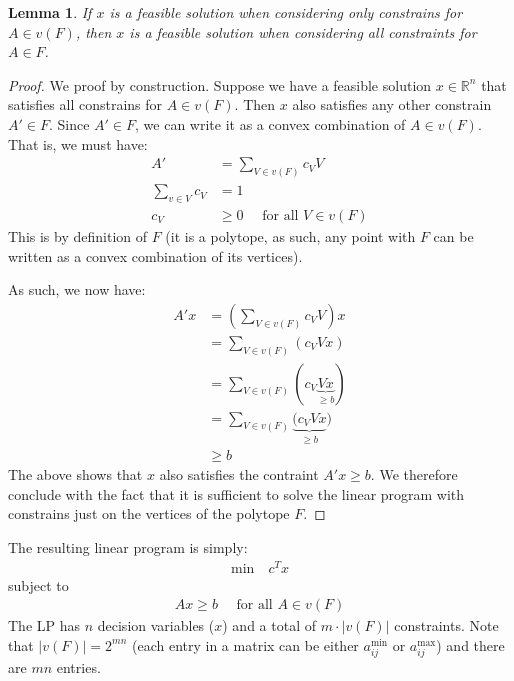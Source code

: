 \documentclass[12pt]{exam}
\newtheorem{lemma}[theorem]{Lemma}
\begin{document}
\begin{questions}
\begin{solution}
\begin{enumerate}[label=(\alph*)]
      \begin{lemma}
        If $x$ is a feasible solution when considering only constrains for $A \in v(F)$, then $x$ is a feasible solution when considering all constraints for $A \in F$.
      \end{lemma}
      \begin{proof}
        We proof by construction. Suppose we have a feasible solution $x \in \mathbb{R}^n$ that satisfies all constrains for $A \in v(F)$. Then $x$ also satisfies any other constrain $A' \in F$. Since $A' \in F$, we can write it as a convex combination of $A \in v(F)$. That is, we must have:
        \begin{align*}
          A' &= \sum_{V \in v(F)} c_V V  \\
          \sum_{v \in V} c_V &= 1 \\
          c_V &\geq 0 \quad \text{ for all } V \in v(F)
        \end{align*}
        This is by definition of $F$ (it is a polytope, as such, any point with $F$ can be written as a convex combination of its vertices).

        As such, we now have:
        \begin{align*}
          A'x &= \left(\sum_{V \in v(F)} c_V V\right)x \tag{As per above} \\
          &= \sum_{V \in v(F)} (c_V Vx) \\
          &= \sum_{V \in v(F)} (c_V \underbrace{Vx}_{\geq b}) \tag{Since $x$ is a feasible solution and $V$ is a vertex contraint} \\
          &= \sum_{V \in v(F)} \underbrace{(c_V Vx}_{\geq b}) \tag{Since $c_V \geq 0$} \\
          &\geq b \tag{Each term is greater than $b$, so sum is as well}
        \end{align*}
        The above shows that $x$ also satisfies the contraint $A'x \geq b$. We therefore conclude with the fact that it is sufficient to solve the linear program with constrains just on the vertices of the polytope $F$.
      \end{proof}

      The resulting linear program is simply:
      \begin{align}
        \text{min} \quad c^T x
      \end{align}
      subject to
      \begin{align}
        Ax \geq b \quad \text{ for all } A \in v(F)
      \end{align}
      The LP has $n$ decision variables ($x$) and a total of $m \cdot |v(F)|$ constraints. Note that $|v(F)| = 2^{mn}$ (each entry in a matrix can be either $a_{ij}^{\min}$ or $a_{ij}^{\max}$) and there are $mn$ entries.


\end{enumerate}
\end{solution}
\end{questions}
\end{document}
